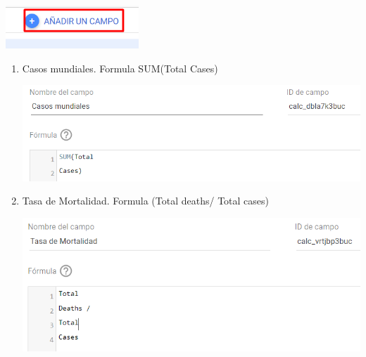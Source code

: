 \documentclass[12pt,letterpaper]{article}
\newcommand\tab[1][1cm]{\hspace*{#1}}
\begin{document}
\begin{enumerate}[\tab 1.]
        \begin{center}
            \includegraphics[width=5cm]{./img/img12.png}
        \end{center}
        \begin{enumerate}
            \item Casos mundiales. Formula SUM(Total Cases)
            \begin{center}
                \includegraphics[width=13cm]{./img/img13.png}
            \end{center}
            \item Tasa de Mortalidad. Formula (Total deaths/ Total cases)
            \begin{center}
                \includegraphics[width=13cm]{./img/img14.png}
            \end{center}
        \end{enumerate}
    \end{enumerate}
\end{document}
